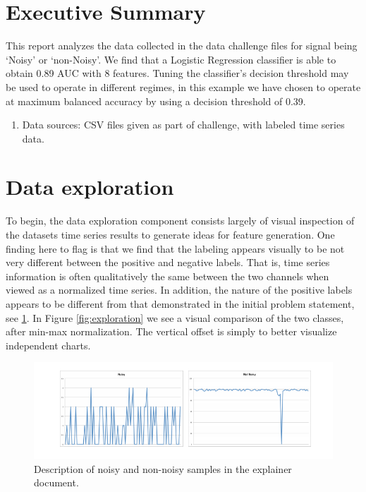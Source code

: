 \documentclass[12pt]{article}
\begin{document}
\tableofcontents
\section{Executive Summary}
This report analyzes the data collected in the data challenge files for signal being `Noisy' or `non-Noisy'. We find that a Logistic Regression classifier is able to obtain 0.89 AUC with 8 features. Tuning the classifier's decision threshold may be used to operate in different regimes, in this example we have chosen to operate at maximum balanced accuracy by using a decision threshold of 0.39.

\begin{enumerate}
\item{Data sources: CSV files given as part of challenge, with labeled time series data. }
\end{enumerate}


\section{Data exploration}
To begin, the data exploration component consists largely of visual inspection of the datasets time series results to generate ideas for feature generation. One finding here to flag is that we find that the labeling appears visually to be not very different between the positive and negative labels. That is, time series information is often qualitatively the same between the two channels when viewed as a normalized time series. In addition, the nature of the positive labels appears to be different from that demonstrated in the initial problem statement, see \ref{fig:spikes}. In Figure \ref{fig:exploration} we see a visual comparison of the two classes, after min-max normalization. The vertical offset is simply to better visualize independent charts. 

\clearpage

\begin{figure}
\centering
\includegraphics[width=1\textwidth]{spikes.png}
\caption{Description of noisy and non-noisy samples in the explainer document. }
\label{fig:spikes}
\end{figure}
\end{document}
